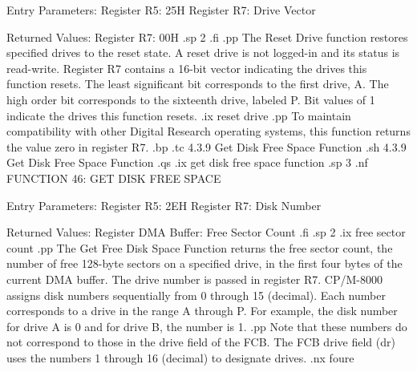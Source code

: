                  Entry Parameters:
                    Register   R5:  25H
                    Register   R7:  Drive Vector

                 Returned  Values:
                    Register   R7:  00H
.sp 2
.fi
.pp
The Reset Drive function restores specified drives to the reset
state.  A reset drive is not logged-in and its status is read-write.
Register   R7 contains a 16-bit vector indicating the
drives this function resets.  The least significant bit corresponds
to the first drive, A.  The high order bit corresponds to the
sixteenth drive, labeled P. Bit values of 1 indicate the
drives this function resets. 
.ix reset drive
.pp
To maintain compatibility with other Digital Research operating
systems, this function returns the value zero in register   R7. 
.bp
.tc         4.3.9  Get Disk Free Space Function
.sh
4.3.9  Get Disk Free Space Function
.qs
.ix get disk free space function
.sp 3
.nf
                FUNCTION 46:  GET DISK FREE SPACE

                Entry Parameters:
                   Register   R5:  2EH
                   Register   R7:  Disk Number

                Returned  Values:
             Register DMA Buffer:  Free Sector Count
.fi
.sp 2
.ix free sector count
.pp
The Get Free Disk Space Function returns the free sector count,
the number of free 128-byte sectors on a specified drive, in the
first four bytes of the current DMA buffer. The drive number 
is passed in register   R7.  CP/M-8000 assigns disk
numbers sequentially from 0 through 15 (decimal). Each
number corresponds to a drive in the range A through P.  For
example, the disk number for drive A is 0 and for drive B, the
number is 1.
.pp
Note that these numbers do not correspond to those
in the drive field of the FCB. The FCB drive field (dr) uses the
numbers 1 through 16 (decimal) to designate drives. 
.nx foure
